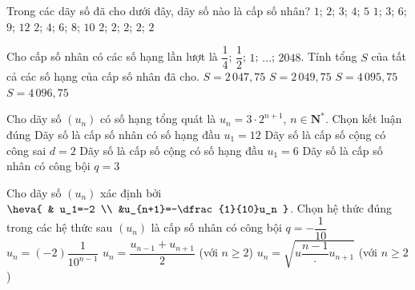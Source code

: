\begin{ex}%
	Trong các dãy số đã cho dưới đây, dãy số nào là  cấp số nhân?
	\choice 
		 {$1$; $2$; $3$; $4$; $5$}
		 {$1$; $3$; $6$; $9$; $12$}
		{$2$; $4$; $6$;  $8$; $10$}
		{\True $2$; $2$; $2$; $2$;  $2$}
\end{ex}

\begin{ex}%
	Cho cấp số nhân có các số hạng lần  lượt là $\dfrac{1}{4}$; $\dfrac{1}{2}$; $1$; $\ldots$; $2048$. Tính tổng $S$ của tất cả các số hạng của cấp số nhân đã cho.
	 \choice
		{$S =  2\,047{,}75$}
		 {$S = 2\,049{,}75$}
		 {\True $S = 4\,095{,}75$}
		{$S  = 4\,096{,}75$}
\end{ex}

\begin{ex}%
	Cho dãy số $(u_n)$ có số hạng tổng quát là $u_n=3\cdot 2^{n+1}$, $n \in \mathbf{N}^{*}$. Chọn kết  luận đúng
	 \choice
		 {\True Dãy số là cấp số nhân có số hạng đầu $u_1=12$}
		 {Dãy số là cấp số cộng có công sai $d=2$}
		{Dãy số là cấp số cộng có số hạng đầu $u_1=6$} 
		{Dãy số là cấp số nhân  có công bội $q=3$}
\end{ex}

\begin{ex}%
	Cho dãy số $(u_n)$ xác định bởi $\heva{  & u_1=-2 \\ &u_{n+1}=-\dfrac{1}{10}u_n }$. Chọn hệ thức đúng trong các hệ thức sau
	\choice 
		{\True $(u_n)$ là cấp  số nhân có công bội $q=-\dfrac{1}{10}$}
		 {$u_n=(-2)\dfrac{1}{10^{n-1}}$}
		{$u_n=\dfrac{u_{n-1}+u_{n+1}}{2}$ (với  $n\ge 2$)}
		{$u_n=\sqrt{u\dfrac{n-1}\cdot u_{n+1}{}}$  (với $n\ge 2$)}
\end{ex}

